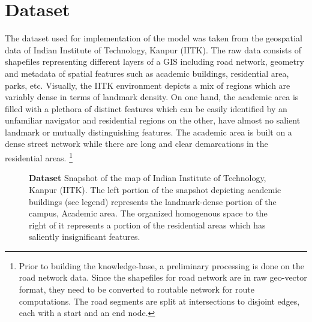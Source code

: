 \documentclass{iitkthesis}
\begin{document}
 \section{Dataset}
The dataset used for implementation of the model was taken from the geospatial data of Indian Institute of Technology, Kanpur (IITK). The raw data consists of shapefiles representing different layers of a GIS including road network, geometry and metadata of spatial features such as academic buildings, residential area, parks, etc. Visually, the IITK environment depicts a mix of regions which are variably dense in terms of landmark density. On one hand, the academic area is filled with a plethora of distinct features which can be easily identified by an unfamiliar navigator and residential regions on the other, have almost no salient landmark or mutually distinguishing features. The academic area is built on a dense street network while there are long and clear demarcations in the residential areas. 
\footnote{Prior to building the knowledge-base, a preliminary processing is done on the road network data. Since the shapefiles for road network are in raw geo-vector format, they need to be converted to routable network for route computations. The road segments are split at intersections to disjoint edges, each with a start and an end node.} 
\begin{figure}
\centering
{}
\caption{\textbf{\textbf{Dataset}} Snapshot of the map of Indian Institute of Technology, Kanpur (IITK). The left portion of the snapshot depicting academic buildings (see legend) represents the landmark-dense portion of the campus, Academic area. The organized homogenous space to the right of it represents a portion of the residential areas which has saliently insignificant features.}
\label{fig:anticipative}
 \end{figure}
\end{document}
